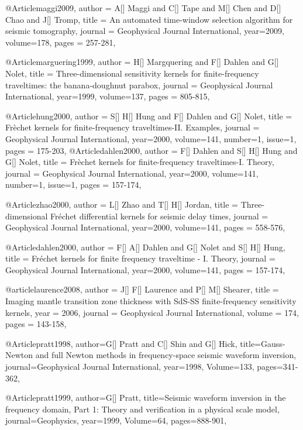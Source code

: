 @Article{maggi2009,
  author =	 {A[] Maggi and C[] Tape and M[] Chen and D[] Chao and J[] Tromp},
  title =	 {An automated time-window selection algorithm for seismic tomography},
  journal =	 {Geophysical Journal International},
  year=2009,
  volume=178,
  pages =	 {257-281},
}

@Article{marguering1999,
  author =	 {H[] Margquering and F[] Dahlen and G[] Nolet},
  title =	 {Three-dimensional sensitivity kernels for finite-frequency traveltimes: the banana-doughnut parabox},
  journal =	 {Geophysical Journal International},
  year=1999,
  volume=137,
  pages =	 {805-815},
}

@Article{hung2000,
  author =	 {S[] H[] Hung and F[] Dahlen and G[] Nolet},
  title =	 {Fr\`{e}chet kernels for finite-frequency traveltimes-II. Examples},
  journal =	 {Geophysical Journal International},
  year=2000,
  volume=141,
  number=1,
  issue=1,
  pages =	 {175-203},
}
@Article{dahlen2000,
  author =	 { F[] Dahlen and S[] H[] Hung and G[] Nolet},
  title =	 {Fr\`{e}chet kernels for finite-frequency traveltimes-I. Theory},
  journal =	 {Geophysical Journal International},
  year=2000,
  volume=141,
  number=1,
  issue=1,
  pages =	 {157-174},
}

@Article{zhao2000,
  author =	 {L[] Zhao and T[] H[] Jordan},
  title =	 {Three-dimensional Fr\'{e}chet differential kernels for seismic delay times},
  journal =	 {Geophysical Journal International},
  year=2000,
  volume=141,
  pages =	 {558-576},
}

@Article{dahlen2000,
  author =	 {F[] A[] Dahlen and G[] Nolet and S[] H[] Hung},
  title =	 {Fr\'{e}chet kernels for finite frequency traveltime - {I}. Theory},
  journal =	 {Geophysical Journal International},
  year=2000,
  volume=141,
  pages =	 {157-174},
}

@article{laurence2008,
author = {J[] F[] Laurence and P[] M[] Shearer},
title = {Imaging mantle transition zone thickness with {S}d{S-SS} finite-frequency sensitivity kernels},
year = {2006},
journal = {Geophysical Journal International},
volume = {174},
pages = {143-158},
}

@Article{pratt1998,
  author={G[] Pratt and C[] Shin and G[] Hick},
  title={Gauss-{N}ewton and full {N}ewton methods in frequency-space seismic waveform inversion},
  journal={Geophysical Journal International},
  year=1998,
  Volume=133,
  pages={341-362},
}

@Article{pratt1999,
  author={G[] Pratt},
  title={Seismic waveform inversion in the frequency domain, {P}art 1: {T}heory and verification in a physical scale model},
  journal={Geophysics},
  year=1999,
  Volume=64,
  pages={888-901},
}

